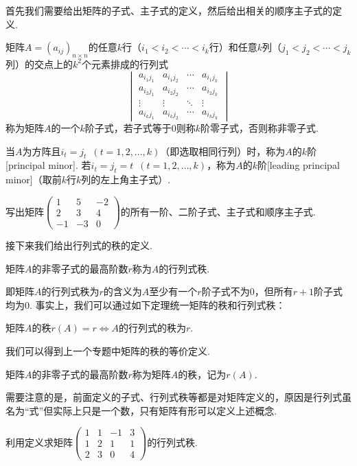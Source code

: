 首先我们需要给出矩阵的子式、主子式的定义，然后给出相关的顺序主子式的定义.
\begin{definition}
    矩阵$A=(a_{ij})_{n \times n}$的任意$k$行（$i_1<i_2<\cdots<i_k$行）和任意$k$列（$j_1<j_2<\cdots<j_k$列）的交点上的$k^2$个元素排成的行列式
    \[\begin{vmatrix}
            a_{i_1j_1} & a_{i_1j_2} & \cdots & a_{i_1j_k} \\
            a_{i_2j_1} & a_{i_2j_2} & \cdots & a_{i_2j_k} \\
            \vdots     & \vdots     & \ddots & \vdots     \\
            a_{i_kj_1} & a_{i_kj_2} & \cdots & a_{i_kj_k}
        \end{vmatrix}\]
    称为矩阵$A$的一个$k$阶子式，若子式等于0则称$k$阶零子式，否则称非零子式.

    当$A$为方阵且$i_t=j_t\enspace(t=1,2,\ldots,k)$（即选取相同行列）时，称为$A$的$k$阶[principal minor]. 若$i_t=j_t=t\enspace(t=1,2,\ldots,k)$，称为$A$的$k$阶[leading principal minor]（取前$k$行$k$列的左上角主子式）.
\end{definition}

\begin{example}
    写出矩阵$\begin{pmatrix}
            1 & 5 & -2 \\ 2 & 3 & 4 \\ -1 & -3 & 0
        \end{pmatrix}$的所有一阶、二阶子式、主子式和顺序主子式.
\end{example}

接下来我们给出行列式的秩的定义.
\begin{definition}
    矩阵$A$的非零子式的最高阶数$r$称为$A$的行列式秩.
\end{definition}
即矩阵$A$的行列式秩为$r$的含义为$A$至少有一个$r$阶子式不为0，但所有$r+1$阶子式均为0. 事实上，我们可以通过如下定理统一矩阵的秩和行列式秩：
\begin{theorem}\label{thm:13:行列式秩等于行列式秩}
    矩阵$A$的秩$r(A)=r \iff A$的行列式的秩为$r$.
\end{theorem}
我们可以得到上一个专题中矩阵的秩的等价定义.
\begin{definition}
    矩阵$A$的非零子式的最高阶数$r$称为矩阵$A$的秩，记为$r(A)$.
\end{definition}

需要注意的是，前面定义的子式、行列式秩等都是对矩阵定义的，原因是行列式虽名为``式''但实际上只是一个数，只有矩阵有形可以定义上述概念.
\begin{example}
    利用定义求矩阵$\begin{pmatrix}
            1 & 1 & -1 & 3 \\ 1 & 2 & 1 & 1 \\ 2 & 3 & 0 & 4
        \end{pmatrix}$的行列式秩.
\end{example}

